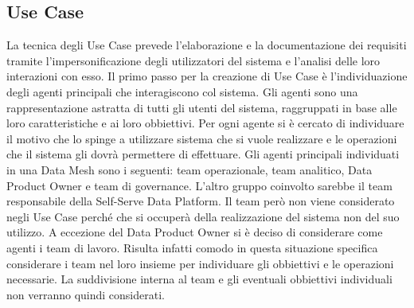 \documentclass[12pt]{report}
\begin{document}
\subsection{Use Case}
La tecnica degli Use Case prevede l'elaborazione e la documentazione dei requisiti tramite l'impersonificazione degli utilizzatori del sistema e l'analisi delle loro interazioni con esso. 
Il primo passo per la creazione di Use Case è l'individuazione degli agenti principali che interagiscono col sistema.
Gli agenti sono una rappresentazione astratta di tutti gli utenti del sistema, raggruppati in base alle loro caratteristiche e ai loro obbiettivi. 
Per ogni agente si è cercato di individuare il motivo che lo spinge a utilizzare sistema che si vuole realizzare e le operazioni che il sistema gli dovrà permettere di effettuare. 
Gli agenti principali individuati in una Data Mesh sono i seguenti: team operazionale, team analitico, Data Product Owner e team di governance.
L'altro gruppo coinvolto sarebbe il team responsabile della Self-Serve Data Platform.
Il team però non viene considerato negli Use Case perché che si occuperà della realizzazione del sistema non del suo utilizzo. 
A eccezione del Data Product Owner si è deciso di considerare come agenti i team di lavoro.
Risulta infatti comodo in questa situazione specifica considerare i team nel loro insieme per individuare gli obbiettivi e le operazioni necessarie. 
La suddivisione interna al team e gli eventuali obbiettivi individuali non verranno quindi considerati.
\end{document}
